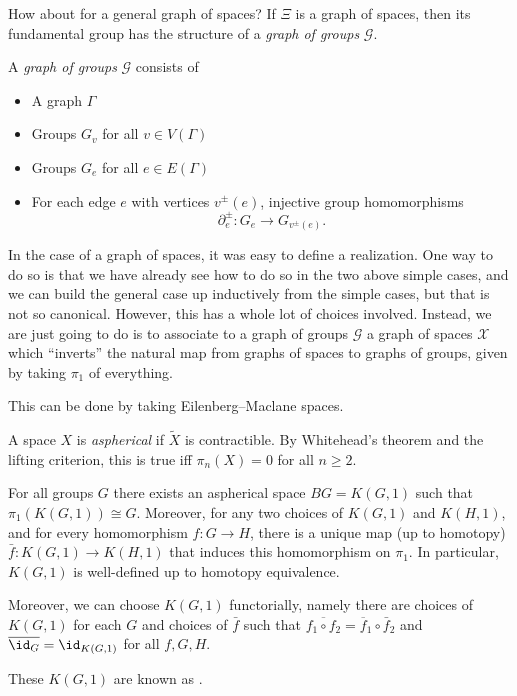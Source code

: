 \documentclass[a4paper]{article}
\begin{document}
How about for a general graph of spaces? If $\Xi$ is a graph of spaces, then its fundamental group has the structure of a \emph{graph of groups} $\mathcal{G}$.

\begin{defi}
  A \emph{graph of groups} $\mathcal{G}$ consists of
  \begin{itemize}
    \item A graph $\Gamma$
    \item Groups $G_v$ for all $v \in V(\Gamma)$
    \item Groups $G_e$ for all $e \in E(\Gamma)$
    \item For each edge $e$ with vertices $v^{\pm}(e)$, injective group homomorphisms
      \[
        \partial_e^{\pm}: G_e \to G_{v^{\pm}(e)}.
      \]
  \end{itemize}
\end{defi}
In the case of a graph of spaces, it was easy to define a realization. One way to do so is that we have already see how to do so in the two above simple cases, and we can build the general case up inductively from the simple cases, but that is not so canonical. However, this has a whole lot of choices involved. Instead, we are just going to do is to associate to a graph of groups $\mathcal{G}$ a graph of spaces $\mathcal{X}$ which ``inverts'' the natural map from graphs of spaces to graphs of groups, given by taking $\pi_1$ of everything.

This can be done by taking Eilenberg--Maclane spaces.
\begin{defi}
  A space $X$ is \emph{aspherical} if $\tilde{X}$ is contractible. By Whitehead's theorem and the lifting criterion, this is true iff $\pi_n(X) = 0$ for all $n \geq 2$.
\end{defi}

\begin{prop}
  For all groups $G$ there exists an aspherical space $BG = K(G, 1)$ such that $\pi_1(K(G, 1)) \cong G$. Moreover, for any two choices of $K(G, 1)$ and $K(H, 1)$, and for every homomorphism $f: G \to H$, there is a unique map (up to homotopy) $\bar{f}: K(G, 1) \to K(H, 1)$ that induces this homomorphism on $\pi_1$. In particular, $K(G, 1)$ is well-defined up to homotopy equivalence.

  Moreover, we can choose $K(G, 1)$ functorially, namely there are choices of $K(G, 1)$ for each $G$ and choices of $\bar{f}$ such that $\overline{f_1 \circ f_2} = \overline{f}_1 \circ \bar{f}_2$ and $\overline{\id_{G}} = \id_{K(G, 1)}$ for all $f, G, H$.
\end{prop}
These $K(G, 1)$ are known as .
\end{document}
